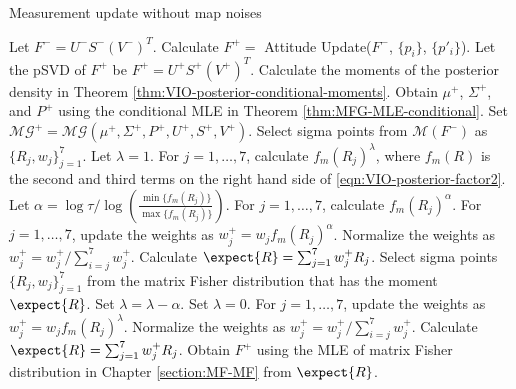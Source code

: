 \begin{table}
	\caption{Measurement update without map noises}
	\label{tab:VIO-update}
	\begin{algorithmic}[1]
		\algrule[0.8pt]
		\algrule
		\State Let $F^- = U^-S^-(V^-)^T$.
		\State Calculate $F^+=$ Attitude Update($F^-$, $\{p_i\}$, $\{p'_i\}$).
		\State Let the pSVD of $F^+$ be $F^+ = U^+S^+(V^+)^T$.
		\State Calculate the moments of the posterior density in Theorem \ref{thm:VIO-posterior-conditional-moments}.
		\State Obtain $\mu^+$, $\Sigma^+$, and $P^+$ using the conditional MLE in Theorem \ref{thm:MFG-MLE-conditional}.
		\State Set $\mathcal{MG}^+ = \mathcal{MG}(\mu^+,\Sigma^+,P^+,U^+,S^+,V^+)$.
		\EndProcedure
		\algrule
		\State Select sigma points \cite{gilitschenski2015unscented,lee2018bayesian} from $\mathcal{M}(F^-)$ as $\{R_j,w_j\}_{j=1}^7$.
		\State Let $\lambda = 1$.
		\State For $j=1,\ldots,7$, calculate $f_m(R_j)^\lambda$, where $f_m(R)$ is the second and third terms on the right hand side of \eqref{eqn:VIO-posterior-factor2}.
		\State Let $\alpha = \log\tau / \log\left( \tfrac{\min\{f_m(R_j)\}}{\max\{f_m(R_j)\}} \right)$.
		\State For $j=1,\ldots,7$, calculate $f_m(R_j)^\alpha$.
		\State For $j=1,\ldots,7$, update the weights as $w_j^+ = w_j f_m(R_j)^\alpha$.
		\State Normalize the weights as $w_j^+ = w_j^+/\sum_{i=j}^7 w_j^+$.
		\State Calculate $\expect{R} = \sum_{j=1}^7 w_j^+ R_j$.
		\State Select sigma points $\{R_j,w_j\}_{j=1}^7$ from the matrix Fisher distribution that has the moment $\expect{R}$.
		\State Set $\lambda = \lambda-\alpha$.
		\Else
		\State Set $\lambda = 0$.
		\EndIf
		\EndWhile
		\State For $j=1,\ldots,7$, update the weights as $w_j^+ = w_j f_m(R_j)^\lambda$.
		\State Normalize the weights as $w_j^+ = w_j^+/\sum_{i=j}^7 w_j^+$.
		\State Calculate $\expect{R} = \sum_{j=1}^7 w_j^+ R_j$.
		\State Obtain $F^+$ using the MLE of matrix Fisher distribution in Chapter \ref{section:MF-MF} from $\expect{R}$.
		\EndProcedure
		\algrule[0.8pt]
	\end{algorithmic}
\end{table}

